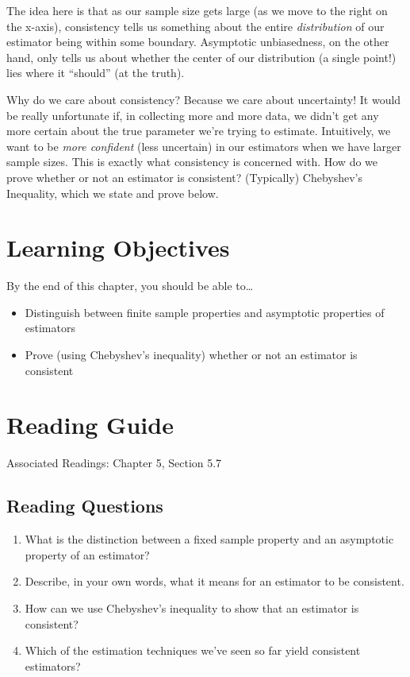 \documentclass[
  letterpaper,
  DIV=11,
  numbers=noendperiod]{scrreprt}
\providecommand{\tightlist}{%
  \setlength{\itemsep}{0pt}\setlength{\parskip}{0pt}}\usepackage{longtable,booktabs,array}
\begin{document}
The idea here is that as our sample size gets large (as we move to the
right on the x-axis), consistency tells us something about the entire
\emph{distribution} of our estimator being within some boundary.
Asymptotic unbiasedness, on the other hand, only tells us about whether
the center of our distribution (a single point!) lies where it
``should'' (at the truth).

Why do we care about consistency? Because we care about uncertainty! It
would be really unfortunate if, in collecting more and more data, we
didn't get any more certain about the true parameter we're trying to
estimate. Intuitively, we want to be \emph{more confident} (less
uncertain) in our estimators when we have larger sample sizes. This is
exactly what consistency is concerned with. How do we prove whether or
not an estimator is consistent? (Typically) Chebyshev's Inequality,
which we state and prove below.

\hypertarget{learning-objectives-4}{%
\section{Learning Objectives}\label{learning-objectives-4}}

By the end of this chapter, you should be able to\ldots{}

\begin{itemize}
\tightlist
\item
  Distinguish between finite sample properties and asymptotic properties
  of estimators
\item
  Prove (using Chebyshev's inequality) whether or not an estimator is
  consistent
\end{itemize}

\hypertarget{reading-guide-4}{%
\section{Reading Guide}\label{reading-guide-4}}

Associated Readings: Chapter 5, Section 5.7

\hypertarget{reading-questions-4}{%
\subsection{Reading Questions}\label{reading-questions-4}}

\begin{enumerate}
\def\labelenumi{\arabic{enumi}.}
\item
  What is the distinction between a fixed sample property and an
  asymptotic property of an estimator?
\item
  Describe, in your own words, what it means for an estimator to be
  consistent.
\item
  How can we use Chebyshev's inequality to show that an estimator is
  consistent?
\item
  Which of the estimation techniques we've seen so far yield consistent
  estimators?
\end{enumerate}
\end{document}
